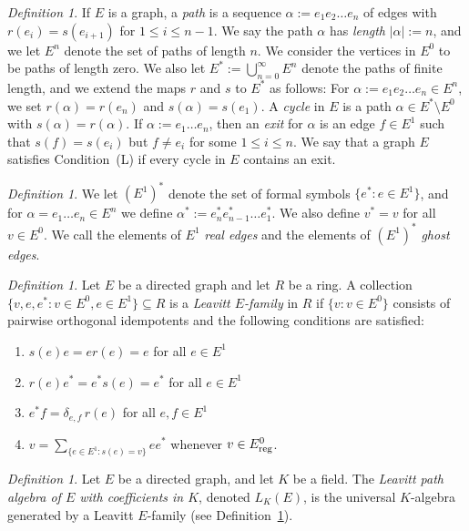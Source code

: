 \documentclass[11pt]{amsart}
\theoremstyle{remark}
\newtheorem{definition}[theorem]{Definition}
\numberwithin{equation}{section}
\newcommand{\reg}{\textnormal{reg}}
\begin{document}
\begin{definition} \label{graph-prelim-defs}
If $E$ is a graph, a \emph{path} is a sequence $\alpha := e_1 e_2 \ldots e_n$ of edges with $r(e_i) = s(e_{i+1})$ for $1 \leq i \leq n-1$.  We say the path $\alpha$ has \emph{length} $| \alpha| :=n$, and we let $E^n$ denote the set of paths of length $n$.  We consider the vertices in $E^0$ to be paths of length zero.  We also let $E^* := \bigcup_{n=0}^\infty E^n$ denote the paths of finite length, and we extend the maps $r$ and $s$ to $E^*$ as follows: For $\alpha := e_1 e_2 \ldots e_n \in E^n$, we set $r(\alpha) = r(e_n)$ and $s(\alpha) = s(e_1)$.   A \emph{cycle} in $E$ is a path $\alpha \in E^* \setminus E^0$ with $s(\alpha) = r(\alpha)$.  If $\alpha := e_1 \ldots e_n$, then an \emph{exit} for $\alpha$ is an edge $f \in E^1$ such that $s(f) = s(e_i)$ but $f \neq e_i$ for some $1 \leq i \leq n$.  We say that a graph $E$ satisfies Condition~(L) if every cycle in $E$ contains an exit. 
\end{definition}


\begin{definition}
We let $(E^1)^*$ denote the set of formal symbols $\{ e^* : e \in E^1 \}$, and for $\alpha = e_1 \ldots e_n \in E^n$ we define $\alpha^* := e_n^* e_{n-1}^* \ldots e_1^*$.  We also define $v^* = v$ for all $v \in E^0$.  We call the elements of $E^1$ \emph{real edges} and the elements of $(E^1)^*$ \emph{ghost edges}.
\end{definition}

\begin{definition} \label{Leavitt-E-fam-def}
Let $E$ be a directed graph and let $R$ be a ring.  A collection $\{ v, e, e^* : v \in E^0, e \in E^1 \} \subseteq R$ is a \emph{Leavitt $E$-family} in $R$ if $\{v : v \in E^0 \}$ consists of pairwise orthogonal idempotents and the following conditions are satisfied:
\begin{enumerate}
\item $s(e)e = er(e) =e$ for all $e \in E^1$
\item $r(e)e^* = e^* s(e) = e^*$ for all $e \in E^1$
\item $e^*f = \delta_{e,f} \, r(e)$ for all $e, f \in E^1$
\item $v = \displaystyle \sum_{\{e \in E^1 : s(e) = v \}} ee^*$ whenever $v \in E^0_\reg$.
\end{enumerate}
\end{definition}


\begin{definition} \label{Leavitt-def}
Let $E$ be a directed graph, and let $K$ be a field.  The \emph{Leavitt path algebra of $E$ with coefficients in $K$}, denoted $L_K(E)$,  is the universal $K$-algebra generated by a Leavitt $E$-family (see Definition~\ref{Leavitt-E-fam-def}).
\end{definition}
\end{document}
